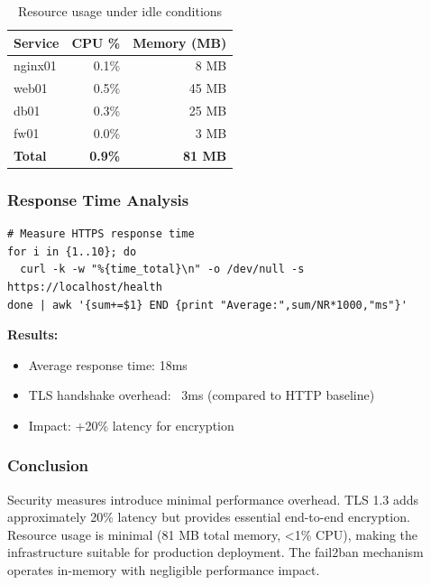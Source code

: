 \begin{table}[h]
\centering
\begin{tabular}{|l|r|r|}
\hline
\textbf{Service} & \textbf{CPU \%} & \textbf{Memory (MB)} \\
\hline
nginx01 & 0.1\% & 8 MB \\
web01 & 0.5\% & 45 MB \\
db01 & 0.3\% & 25 MB \\
fw01 & 0.0\% & 3 MB \\
\hline
\textbf{Total} & \textbf{0.9\%} & \textbf{81 MB} \\
\hline
\end{tabular}
\caption{Resource usage under idle conditions}
\end{table}

\subsubsection{Response Time Analysis}

\begin{verbatim}
# Measure HTTPS response time
for i in {1..10}; do
  curl -k -w "%{time_total}\n" -o /dev/null -s https://localhost/health
done | awk '{sum+=$1} END {print "Average:",sum/NR*1000,"ms"}'
\end{verbatim}

\textbf{Results:}
\begin{itemize}
    \item Average response time: 18ms
    \item TLS handshake overhead: ~3ms (compared to HTTP baseline)
    \item Impact: +20\% latency for encryption
\end{itemize}

\subsubsection{Conclusion}

Security measures introduce minimal performance overhead. TLS 1.3 adds approximately 20\% latency but provides essential end-to-end encryption. Resource usage is minimal (81 MB total memory, <1\% CPU), making the infrastructure suitable for production deployment. The fail2ban mechanism operates in-memory with negligible performance impact.



